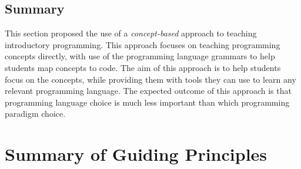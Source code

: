 



\subsection{Summary} %
\label{ssub:summary_of_principles_for_what_to_teach}

This section proposed the use of a \emph{concept-based} approach to teaching introductory programming. This approach focuses on teaching programming concepts directly, with use of the programming language grammars to help students map concepts to code. The aim of this approach is to help students focus on the concepts, while providing them with tools they can use to learn any relevant programming language. The expected outcome of this approach is that programming language choice is much less important than which programming paradigm choice. 


\clearpage
\section{Summary of Guiding Principles} %
\label{sec:summary_of_guiding_principles}

